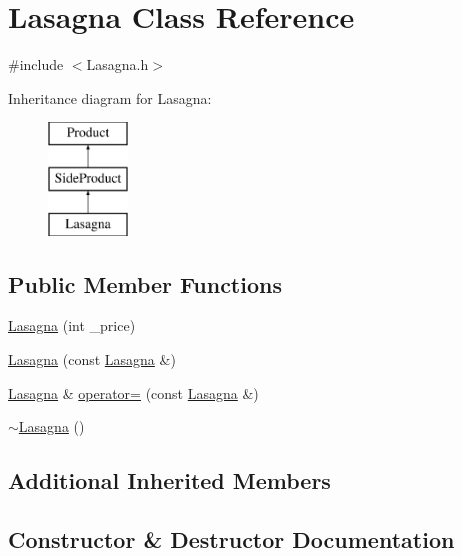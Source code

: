 \hypertarget{classLasagna}{}\section{Lasagna Class Reference}
\label{classLasagna}


{\ttfamily \#include $<$Lasagna.\+h$>$}

Inheritance diagram for Lasagna\+:\begin{figure}[H]
\begin{center}
\leavevmode
\includegraphics[height=3.000000cm]{classLasagna}
\end{center}
\end{figure}
\subsection*{Public Member Functions}
\begin{DoxyCompactItemize}
\item 
\mbox{\hyperlink{classLasagna_a3b50250954c0bb76b6d91abe8ab56b61}{Lasagna}} (int \+\_\+price)
\item 
\mbox{\hyperlink{classLasagna_ad8f240976568ffeda2967f3a92f0a050}{Lasagna}} (const \mbox{\hyperlink{classLasagna}{Lasagna}} \&)
\item 
\mbox{\hyperlink{classLasagna}{Lasagna}} \& \mbox{\hyperlink{classLasagna_a8a7d37e51d0758e731bf07d1717cc8df}{operator=}} (const \mbox{\hyperlink{classLasagna}{Lasagna}} \&)
\item 
\mbox{\hyperlink{classLasagna_a5ef1f90e14286d828590c25710086991}{$\sim$\+Lasagna}} ()
\end{DoxyCompactItemize}
\subsection*{Additional Inherited Members}


\subsection{Constructor \& Destructor Documentation}
\mbox{\label{classLasagna_a3b50250954c0bb76b6d91abe8ab56b61}} 

